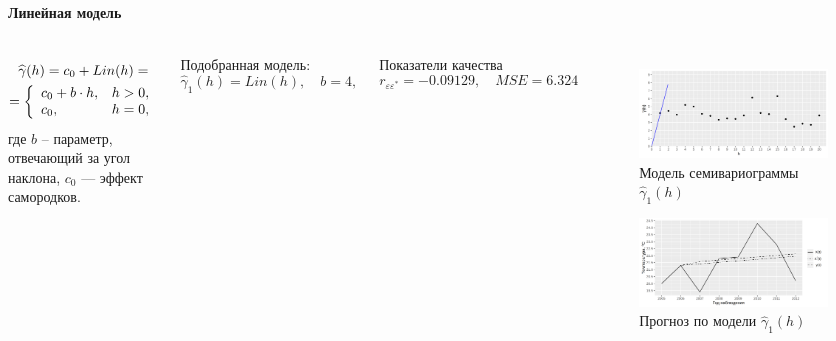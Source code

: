 \documentclass[notheorems]{beamer}
\theoremstyle{definition}
\theoremstyle{example}
\theoremstyle{plain}
\begin{document}
\begin{frame}
  \frametitle{\large\subsecname}
  \framesubtitle{Линейная модель}
  \begin{columns}[c]
  {\footnotesize
  \begin{equation}\begin{gathered}
  \label{eq:lin}
    \widehat{\gamma}(h) = c_0 + Lin(h) = \\
    = \left\{
   \begin{array}{l l}
     c_0 + b \cdot h, & h > 0, \\
     c_0, & h = 0,
   \end{array} \right.
  \end{gathered}\end{equation}
  где $ b $ -- параметр, отвечающий за угол наклона, $ c_0 $ --- эффект самородков.

  \vspace{0.5em}

  Подобранная модель:
  \begin{equation}
  \label{eq:gamma1}
    \widehat{\gamma}_1(h) = Lin(h), \quad b = 4,
  \end{equation}

  Показатели качества
  \begin{equation*}
    r_{\varepsilon\varepsilon^{*}} = -0.09129, \quad MSE = 6.324
  \end{equation*}
  }

  \vspace{-14.5pt}
  \begin{figure}[H]
    \includegraphics[width=0.9\linewidth]{../../figures/variogram/lin-modeled.png} \\
    \caption{Модель семивариограммы $\widehat{\gamma}_1(h)$}
    \includegraphics[width=0.9\linewidth]{../../figures/variogram/lin-cross-prediction.png}
    \caption{Прогноз по модели $\widehat{\gamma}_1(h)$}
  \end{figure}
  \end{columns}
\end{frame}
\end{document}
